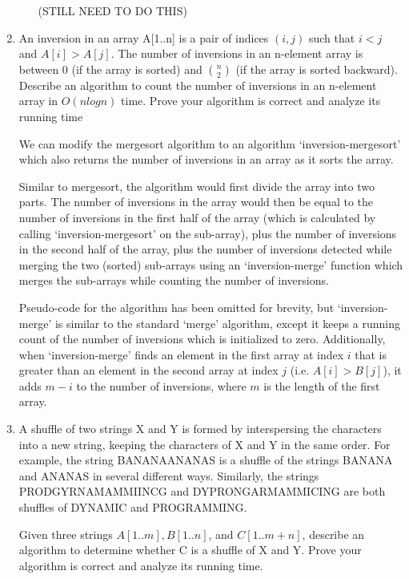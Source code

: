 \documentclass{article}
\begin{document}
\begin{enumerate}
\begin{enumerate}
(STILL NEED TO DO THIS)

    \end{enumerate}

\item 
An inversion in an array A[1..n] is a pair of indices $(i, j)$ such that $i < j$ and
$A[i] > A[j]$. The number of inversions in an n-element array is between 0 (if the array is sorted)
and $n \choose 2$ (if the array is sorted backward). Describe an algorithm to count the number of inversions
in an n-element array in $O(n log n)$ time. Prove your algorithm is correct and analyze its running
time


We can modify the mergesort algorithm to an algorithm `inversion-mergesort' which also returns the number of inversions in an array as it sorts the array.

Similar to mergesort, the algorithm would first divide the array into two parts. 
The number of inversions in the array would then be equal to the number of inversions in the first half of the array (which is calculated by calling `inversion-mergesort' on the sub-array), plus the number of inversions in the second half of the array, plus the number of inversions detected while merging the two (sorted) sub-arrays using an `inversion-merge' function which merges the sub-arrays while counting the number of inversions.

Pseudo-code for the algorithm has been omitted for brevity, but `inversion-merge' is similar to the standard `merge' algorithm, except it keeps a running count of the number of inversions which is initialized to zero. 
Additionally, when `inversion-merge' finds an element in the first array at index $i$ that is greater than an element in the second array at index $j$ (i.e. $A[i] > B[j]$), it adds $m-i$ to the number of inversions, where $m$ is the length of the first array.



\item 
A shuffle of two strings X and Y is formed by interspersing the characters into a new string,
keeping the characters of X and Y in the same order. For example, the string BANANAANANAS
is a shuffle of the strings BANANA and ANANAS in several different ways.
Similarly, the strings PRODGYRNAMAMMIINCG and DYPRONGARMAMMICING are both
shuffles of DYNAMIC and PROGRAMMING.

Given three strings $A[1..m], B[1..n]$, and $C[1..m + n]$, describe an algorithm to determine
whether C is a shuffle of X and Y. Prove your algorithm is correct and analyze its running time.


\end{enumerate}
\end{document}

